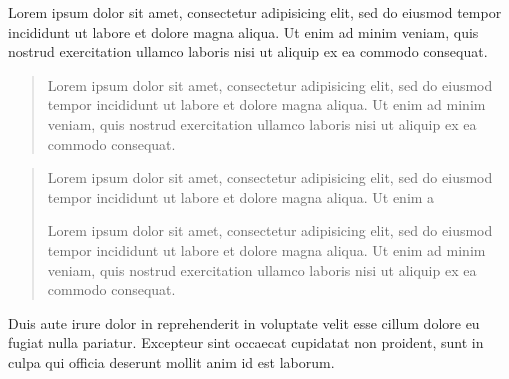 \documentclass{article}
\begin{document}
    Lorem ipsum dolor sit amet, consectetur adipisicing elit, sed do eiusmod tempor incididunt ut labore et dolore magna aliqua. Ut enim ad minim veniam, quis nostrud exercitation ullamco laboris nisi ut aliquip ex ea commodo consequat. 
    
    \begin{quotation}
        Lorem ipsum dolor sit amet, consectetur adipisicing elit, sed do eiusmod tempor incididunt ut labore et dolore magna aliqua. Ut enim ad minim veniam, quis nostrud exercitation ullamco laboris nisi ut aliquip ex ea commodo consequat. 
    
    \end{quotation}
\begingroup
  \beginnumbering
	
    \pstart
    \lipsum[1]
    \pend
	

    \pstart
    
    \begin{quotation}
    
    Lorem ipsum dolor sit amet, consectetur adipisicing elit, sed do eiusmod tempor incididunt ut labore et dolore magna aliqua. Ut enim a
    
  Lorem ipsum dolor sit amet, consectetur adipisicing elit, sed do eiusmod tempor incididunt ut labore et dolore magna aliqua. Ut enim ad minim veniam, quis nostrud exercitation ullamco laboris nisi ut aliquip ex ea commodo consequat. 
    \end{quotation}
  
  
   Duis aute irure dolor in reprehenderit in voluptate velit esse cillum dolore eu fugiat nulla pariatur. Excepteur sint occaecat cupidatat non proident, sunt in culpa qui officia deserunt mollit anim id est laborum.
    
    
    \pend
    \pstart
    \lipsum[3]
    \pend

  \endnumbering
\endgroup
\end{document}
